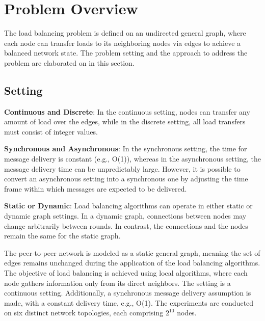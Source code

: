 \chapter{Problem Overview}\label{chap:problemoverview}
The load balancing problem is defined on an undirected general graph, where each node can transfer loads to its neighboring nodes via edges to achieve a balanced network state. The problem setting and the approach to address the problem are elaborated on in this section.

\section{Setting}\label{sec:setting}
\textbf{Continuous and Discrete}: In the continuous setting, nodes can transfer any amount of load over the edges, while in the discrete setting, all load transfers must consist of integer values.

\textbf{Synchronous and Asynchronous}:  In the synchronous setting, the time for message delivery is constant (e.g., O(1)), whereas in the asynchronous setting, the message delivery time can be unpredictably large. However, it is possible to convert an asynchronous setting into a synchronous one by adjusting the time frame within which messages are expected to be delivered.

\textbf{Static or Dynamic}: Load balancing algorithms can operate in either static or dynamic graph settings. In a dynamic graph, connections between nodes may change arbitrarily between rounds. In contrast, the connections and the nodes remain the same for the static graph.

The peer-to-peer network is modeled as a static general graph, meaning the set of edges remains unchanged during the application of the load balancing algorithms. The objective of load balancing is achieved using local algorithms, where each node gathers information only from its direct neighbors. The setting is a continuous setting. Additionally, a synchronous message delivery assumption is made, with a constant delivery time, e.g., O(1). The experiments are conducted on six distinct network topologies, each comprising $2^{10}$ nodes.

